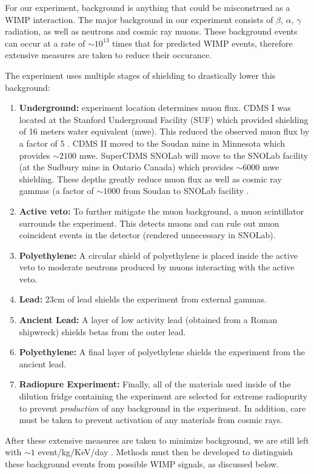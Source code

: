 \documentclass{report}
\begin{document}
For our experiment, background is anything that could be misconstrued as a WIMP interaction. The major background in our experiment consists of $\beta$, $\alpha$, $\gamma$ radiation, as well as neutrons and cosmic ray muons. These background events can occur at a rate of $ \sim 10^{13}$ times that for predicted WIMP events, therefore extensive measures are taken to reduce their occurance.

The experiment uses multiple stages of shielding to drastically lower this background:
\begin{enumerate}
\item \textbf{Underground:} experiment location determines muon flux. CDMS I was located at the Stanford Underground Facility (SUF) which provided shielding of 16 meters water equivalent (mwe). This reduced the observed muon flux by a factor of 5 \cite{Abusaidi2000}. CDMS II moved to the Soudan mine in Minnesota which provides $\sim 2100$ mwe. SuperCDMS SNOLab will move to the SNOLab facility (at the Sudbury mine in Ontario Canada) which provides $\sim 6000$ mwe shielding. These depths greatly reduce muon flux as well as cosmic ray gammas (a factor of $\sim 1000$ from Soudan to SNOLab facility \cite{Saab2012}.
\item \textbf{Active veto:} To further mitigate the muon background, a muon scintillator surrounds the experiment. This detects muons and can rule out muon coincident events in the detector (rendered unnecessary in SNOLab).
\item \textbf{Polyethylene:} A circular shield of polyethylene is placed inside the active veto to moderate neutrons produced by muons interacting with the active veto.
\item \textbf{Lead:} 23cm of lead shields the experiment from external gammas.
\item \textbf{Ancient Lead:} A layer of low activity lead (obtained from a Roman shipwreck) shields betas from the outer lead.
\item \textbf{Polyethylene:} A final layer of polyethylene shields the experiment from the ancient lead.
\item \textbf{Radiopure Experiment:} Finally, all of the materials used inside of the dilution fridge containing the experiment are selected for extreme radiopurity to prevent \emph{production} of any background in the experiment. In addition, care must be taken to prevent activation of any materials from cosmic rays.
\end{enumerate}

After these extensive measures are taken to minimize background, we are still left with $\sim 1$ event/kg/KeV/day \cite{Saab2012}. Methods must then be developed to distinguish these background events from possible WIMP signals, as discussed below.
\end{document}
